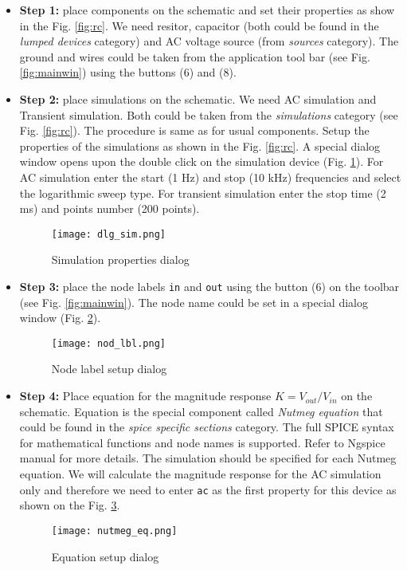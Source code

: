 \begin{itemize}
 \item \textbf{Step 1:} place components on the schematic and set their properties as show in the Fig. \ref{fig:rc}. We need resitor, capacitor (both could be found in the \emph{lumped devices} category) and AC voltage source (from \emph{sources} category). The ground and wires could be taken from the application tool bar (see Fig. \ref{fig:mainwin}) using the buttons (6) and (8).

 \item \textbf{Step 2:} place simulations on the schematic. We need AC simulation and Transient simulation. Both could be taken from the \emph{simulations} category (see Fig. \ref{fig:rc}). The procedure is same as for usual components. Setup the properties of the simulations as shown in the Fig. \ref{fig:rc}. A special dialog window opens upon the double click on the simulation device (Fig. \ref{fig:dlg_sim}). For AC simulation enter the start (1 Hz) and stop (10 kHz) frequencies and select the logarithmic sweep type. For transient simulation enter the stop time (2 ms) and points number (200 points).
 \begin{figure}[!ht]
  \begin{center}
    \texttt{[image: dlg\_sim.png]}
  \end{center}
  \caption{Simulation properties dialog} \label{fig:dlg_sim}
\end{figure}

 \pagebreak[4]

 \item \textbf{Step 3:} place the node labels \verb|in| and \verb|out| using the button (6) on the toolbar (see Fig. \ref{fig:mainwin}). The node name could be set in a special dialog window (Fig. \ref{fig:nod_lbl}).
 \begin{figure}[!ht]
  \begin{center}
    \texttt{[image: nod\_lbl.png]}
  \end{center}
  \caption{Node label setup dialog} \label{fig:nod_lbl}
\end{figure}

 \item \textbf{Step 4:} Place equation for the magnitude response $K=V_{out}/V_{in}$ on the schematic. Equation is the special component called \emph{Nutmeg equation} that could be found in the \emph{spice specific sections} category. The full SPICE syntax for mathematical functions and node names is supported. Refer to Ngspice manual for more details. The simulation should be specified for each Nutmeg equation. We will calculate the magnitude response for the AC simulation only and therefore we need to enter \verb|ac| as the first property for this device as shown on the Fig. \ref{fig:eq}.
  \begin{figure}[!ht]
  \begin{center}
    \texttt{[image: nutmeg\_eq.png]}
  \end{center}
  \caption{Equation setup dialog} \label{fig:eq}
\end{figure}


\end{itemize}
